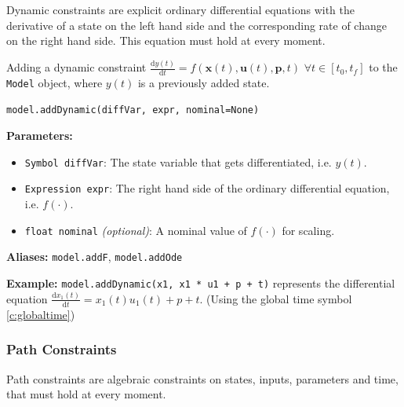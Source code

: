 \documentclass[12pt]{article}
\newcommand{\dd}{\mathrm{d}}
\renewcommand{\v}{\bm}
\begin{document}
Dynamic constraints are explicit ordinary differential equations with
the derivative of a state on the left hand side and the corresponding rate of
change on the right hand side. This equation must hold at every moment.

\begin{mdframed}[backgroundcolor=gray!10, roundcorner=10pt,
		linewidth=1pt]

	Adding a dynamic constraint $\frac{\dd y(t)}{\dd t} =
		f(\v{x}(t), \v{u}(t), \v{p}, t) \,\, \forall t \in [t_0, t_f]$ to
	the \texttt{Model}
	object, where $y(t)$ is a previously added state.

	\begin{lstlisting}
model.addDynamic(diffVar, expr, nominal=None)
		\end{lstlisting}
	\label{addDynamic}
	\textbf{Parameters:}
	\begin{itemize}
		\item \texttt{Symbol diffVar}: The state variable that
		      gets differentiated, i.e. $y(t)$.
		\item \texttt{Expression expr}: The right hand side of
		      the ordinary differential equation, i.e. $f(\cdot)$.
		\item \texttt{float nominal} \emph{(optional)}: A
		      nominal value of $f(\cdot)$ for scaling.
	\end{itemize}

	\textbf{Aliases:}  \texttt{model.addF}, \texttt{model.addOde}

	\textbf{Example:} \texttt{model.addDynamic(x1, x1 * u1 + p +
		t)} represents the differential equation
	$\frac{\dd x_1(t)}{\dd t} = x_1(t) u_1(t) + p + t$. (Using the
	global time symbol \eqref{c:globaltime})
\end{mdframed}

\subsubsection{Path Constraints}

Path constraints are algebraic constraints on states, inputs,
parameters and time, that must hold at every moment.
\end{document}
